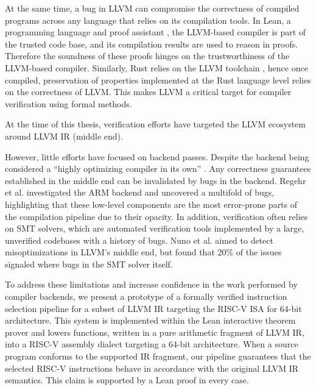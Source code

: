 \documentclass[review, anonymous, acmsmall, screen]{acmart}
\begin{document}
At the same time, a bug in LLVM can compromise the correctness of compiled programs across any 
language that relies on its compilation tools. In Lean, a programming language and proof assistant 
\cite{Lean4}, the LLVM-based compiler is part of the trusted code base, and its compilation results 
are used to reason in proofs. Therefore the soundness of these proofs hinges on the trustworthiness 
of the LLVM-based compiler. Similarly, Rust relies on the LLVM toolchain \cite{Rustlantis}, hence 
once compiled, preservation of properties implemented at the Rust language level relies on the 
correctness of LLVM. This makes LLVM a critical target for compiler verification using formal methods.

At the time of this thesis, verification efforts have targeted the LLVM ecosystem around LLVM IR 
(middle end). 

However, little efforts have focused on backend passes. Despite the backend being considered a 
“highly optimizing compiler in its own” \cite{Regehr2025}. Any correctness guarantees established 
in the middle end can be invalidated by bugs in the backend. Regehr et al. \cite{Regehr2025} 
investigated the ARM backend and uncovered a multifold of bugs, highlighting that these low-level 
components are the most error-prone parts of the compilation pipeline due to their opacity\cite{Mullen2016}.
 In addition, verification often relies on SMT solvers, which are automated verification tools 
 implemented by a large, unverified codebases with a history of bugs. Nuno et al. \cite{Nuno2021Alive2} 
 aimed to detect misoptimizations in LLVM’s middle end, but found that 20\% of the issues signaled 
 where bugs in the SMT solver itself.


To address these limitations and increase confidence in the work performed by compiler backends, we 
present a prototype of a formally verified instruction selection pipeline for a subset of LLVM IR 
targeting the RISC-V ISA for 64-bit architecture. This system is implemented within the Lean interactive
theorem prover and lowers functions, written in a pure arithmetic fragment of LLVM IR, into a RISC-V
assembly dialect targeting a 64-bit architecture.  When a source program conforms to the supported
IR fragment, our pipeline guarantees that the selected RISC-V instructions behave in accordance 
with the original LLVM IR semantics. This claim is supported by a Lean proof in every case.
\end{document}
